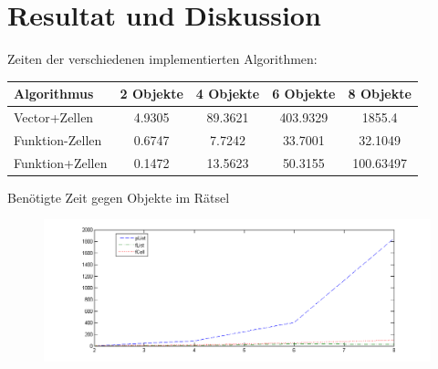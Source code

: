 \documentclass[final]{beamer}
\begin{document}
\section{Resultat und Diskussion}

\begin{frame}
Zeiten der verschiedenen implementierten Algorithmen:\\
\vskip 1cm
\begin{tabular}{l||c|c|c|c||}
Algorithmus&2 Objekte&4 Objekte&6 Objekte & 8 Objekte\\\hline\hline
Vector+Zellen &4.9305& 89.3621&403.9329&1855.4 \\
Funktion-Zellen  &0.6747   & 7.7242& 33.7001  & 32.1049 \\
Funktion+Zellen &  0.1472  &13.5623 & 50.3155 & 100.63497\\
\end{tabular}
\end{frame}

\begin{frame}
Benötigte Zeit gegen Objekte im Rätsel
\begin{figure}
\includegraphics[width=\textwidth]{../thesis/pointAgainstFuncAgainstCell.png}
\end{figure}
\end{frame}
\end{document}
